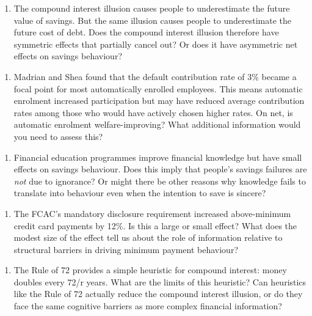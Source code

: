 \documentclass[12pt, letterpaper]{article}
\begin{document}
\begin{enumerate}
\item The compound interest illusion causes people to underestimate the future value of savings. But the same illusion causes people to underestimate the future cost of debt. Does the compound interest illusion therefore have symmetric effects that partially cancel out? Or does it have asymmetric net effects on savings behaviour?
\end{enumerate}

\begin{enumerate}
\item Madrian and Shea found that the default contribution rate of 3\% became a focal point for most automatically enrolled employees. This means automatic enrolment increased participation but may have reduced average contribution rates among those who would have actively chosen higher rates. On net, is automatic enrolment welfare-improving? What additional information would you need to assess this?
\end{enumerate}

\begin{enumerate}
\item Financial education programmes improve financial knowledge but have small effects on savings behaviour. Does this imply that people's savings failures are \textit{not} due to ignorance? Or might there be other reasons why knowledge fails to translate into behaviour even when the intention to save is sincere?
\end{enumerate}

\begin{enumerate}
\item The FCAC's mandatory disclosure requirement increased above-minimum credit card payments by 12\%. Is this a large or small effect? What does the modest size of the effect tell us about the role of information relative to structural barriers in driving minimum payment behaviour?
\end{enumerate}

\begin{enumerate}
\item The Rule of 72 provides a simple heuristic for compound interest: money doubles every 72/r years. What are the limits of this heuristic? Can heuristics like the Rule of 72 actually reduce the compound interest illusion, or do they face the same cognitive barriers as more complex financial information?
\end{enumerate}
\end{document}
